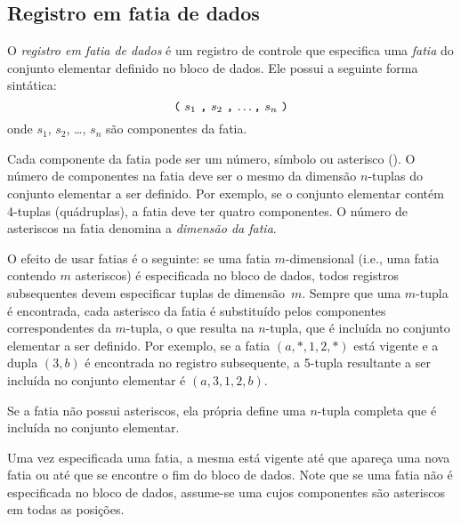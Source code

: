 \documentclass[11pt, brazil]{report}
\begin{document}
\subsection{Registro em fatia de dados}

O {\it registro em fatia de dados} é um registro de controle que especifica
uma {\it fatia} do conjunto elementar definido no bloco de dados. Ele possui
a seguinte forma sintática:
$$\mbox{{\tt(} $s_1$ {\tt,} $s_2$ {\tt,} \dots {\tt,} $s_n$ {\tt)}}$$
onde $s_1$, $s_2$, \dots, $s_n$ são componentes da fatia.

Cada componente da fatia pode ser um número, símbolo ou asterisco
({\tt*}). O número de \linebreak componentes na fatia deve ser o mesmo da
dimensão $n$-tuplas do conjunto elementar a ser definido. Por exemplo,
se o conjunto elementar contém 4-tuplas (quádruplas), a fatia deve ter
quatro \linebreak componentes. O número de asteriscos na fatia denomina a
{\it dimensão da fatia}.

O efeito de usar fatias é o seguinte: se uma fatia $m$-dimensional
(i.e., uma fatia contendo $m$ asteriscos) é especificada no bloco de dados,
todos registros subsequentes devem especificar tuplas de dimensão~$m$.
Sempre que uma $m$-tupla é encontrada, cada asterisco da fatia é substituído
pelos componentes correspondentes da $m$-tupla, o que resulta na
$n$-tupla, que é incluída no conjunto \linebreak elementar a ser definido.
Por exemplo, se a fatia $(a,*,1,2,*)$ está vigente e a dupla
$(3,b)$ é encontrada no registro subsequente, a 5-tupla resultante a ser incluída
no conjunto elementar é $(a,3,1,2,b)$.

Se a fatia não possui asteriscos, ela própria define uma $n$-tupla completa
que é incluída no conjunto elementar.

Uma vez especificada uma fatia, a mesma está vigente até que apareça uma nova
fatia ou até que se encontre o fim do bloco de dados. Note que se uma fatia
não é especificada no bloco de dados, assume-se uma cujos componentes são
asteriscos em todas as posições.
\end{document}
